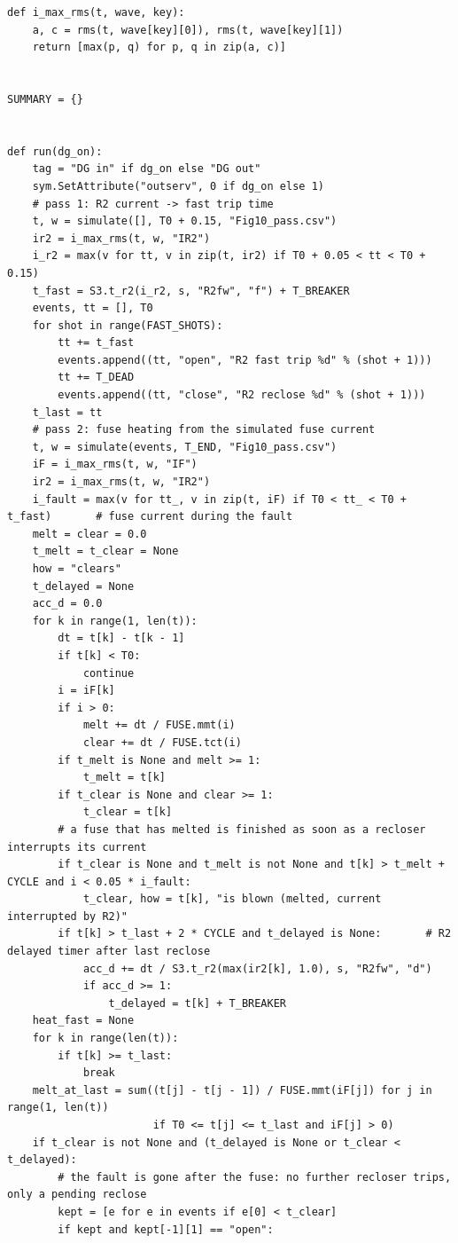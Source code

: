 \documentclass[12pt,a4paper]{article}
\begin{document}
\begin{lstlisting}
def i_max_rms(t, wave, key):
    a, c = rms(t, wave[key][0]), rms(t, wave[key][1])
    return [max(p, q) for p, q in zip(a, c)]


SUMMARY = {}


def run(dg_on):
    tag = "DG in" if dg_on else "DG out"
    sym.SetAttribute("outserv", 0 if dg_on else 1)
    # pass 1: R2 current -> fast trip time
    t, w = simulate([], T0 + 0.15, "Fig10_pass.csv")
    ir2 = i_max_rms(t, w, "IR2")
    i_r2 = max(v for tt, v in zip(t, ir2) if T0 + 0.05 < tt < T0 + 0.15)
    t_fast = S3.t_r2(i_r2, s, "R2fw", "f") + T_BREAKER
    events, tt = [], T0
    for shot in range(FAST_SHOTS):
        tt += t_fast
        events.append((tt, "open", "R2 fast trip %d" % (shot + 1)))
        tt += T_DEAD
        events.append((tt, "close", "R2 reclose %d" % (shot + 1)))
    t_last = tt
    # pass 2: fuse heating from the simulated fuse current
    t, w = simulate(events, T_END, "Fig10_pass.csv")
    iF = i_max_rms(t, w, "IF")
    ir2 = i_max_rms(t, w, "IR2")
    i_fault = max(v for tt_, v in zip(t, iF) if T0 < tt_ < T0 + t_fast)       # fuse current during the fault
    melt = clear = 0.0
    t_melt = t_clear = None
    how = "clears"
    t_delayed = None
    acc_d = 0.0
    for k in range(1, len(t)):
        dt = t[k] - t[k - 1]
        if t[k] < T0:
            continue
        i = iF[k]
        if i > 0:
            melt += dt / FUSE.mmt(i)
            clear += dt / FUSE.tct(i)
        if t_melt is None and melt >= 1:
            t_melt = t[k]
        if t_clear is None and clear >= 1:
            t_clear = t[k]
        # a fuse that has melted is finished as soon as a recloser interrupts its current
        if t_clear is None and t_melt is not None and t[k] > t_melt + CYCLE and i < 0.05 * i_fault:
            t_clear, how = t[k], "is blown (melted, current interrupted by R2)"
        if t[k] > t_last + 2 * CYCLE and t_delayed is None:       # R2 delayed timer after last reclose
            acc_d += dt / S3.t_r2(max(ir2[k], 1.0), s, "R2fw", "d")
            if acc_d >= 1:
                t_delayed = t[k] + T_BREAKER
    heat_fast = None
    for k in range(len(t)):
        if t[k] >= t_last:
            break
    melt_at_last = sum((t[j] - t[j - 1]) / FUSE.mmt(iF[j]) for j in range(1, len(t))
                       if T0 <= t[j] <= t_last and iF[j] > 0)
    if t_clear is not None and (t_delayed is None or t_clear < t_delayed):
        # the fault is gone after the fuse: no further recloser trips, only a pending reclose
        kept = [e for e in events if e[0] < t_clear]
        if kept and kept[-1][1] == "open":

\end{lstlisting}
\end{document}
